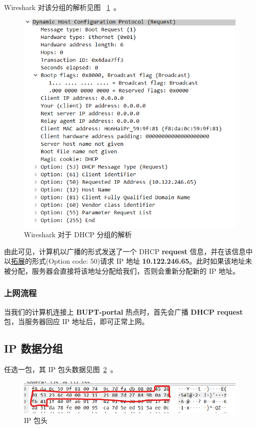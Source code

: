 \documentclass[blue,normal,cn]{elegantnote}
\begin{document}
Wireshark 对该分组的解析见图 ~\ref{DHCP_result}~。

\begin{figure}[!htbp]
	\centering
	\includegraphics[width=.7\textwidth]{DHCP_result.png}
	\caption{Wireshark 对于 DHCP 分组的解析}
	\label{DHCP_result}
\end{figure}

由此可见，计算机以广播的形式发送了一个 DHCP \textbf{request} 信息，并在该信息中以\href{https://tools.ietf.org/html/rfc2132#section-9.1}{拓展}的形式(Option code: 50)请求 IP 地址 \textbf{10.122.246.65}。此时如果该地址未被分配，服务器会直接将该地址分配给我们，否则会重新分配新的 IP 地址。

\subsubsection{上网流程}
当我们的计算机连接上 \textbf{BUPT-portal} 热点时，首先会广播 \textbf{DHCP request} 包，当服务器回应 IP 地址后，即可正常上网。 

\subsection{IP 数据分组}
任选一包，其 IP 包头数据见图~\ref{IP_raw}~。

\begin{figure}[!htbp]
	\centering
	\includegraphics[width=.7\textwidth]{IP_raw.png}
	\caption{IP 包头}
	\label{IP_raw}
\end{figure}
\end{document}
